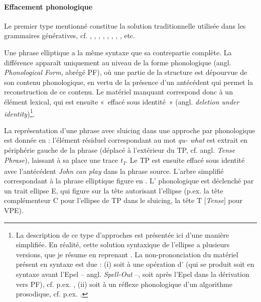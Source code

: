 \paragraph{Effacement phonologique}

Le premier type mentionné constitue la solution traditionnelle utilisée dans les grammaires génératives, cf. \citet{Ross1967,Ross1969}, \citet{Sag1976}, \citet{HankamerEtAl1976}, \citet{Hankamer1979}, \citet{Lasnik1999}, \citet{Hartmann2000}, \citet{Merchant2001}, \citet{Chung2005}, etc.

Une phrase elliptique a la même syntaxe que sa contrepartie complète. La différence apparaît uniquement au niveau de la forme phonologique (angl. \textit{Phonological Form}, abrégé PF), où une partie de la structure est dépourvue de son contenu phonologique, en vertu de la présence d’un antécédent qui permet la reconstruction de ce contenu. Le matériel manquant correspond donc à un élément lexical, qui est ensuite «~effacé sous identité~» (angl. \textit{deletion under identity})\footnote{La description de ce type d’approches est présentée ici d’une manière simplifiée. En réalité, cette solution syntaxique de l’ellipse a plusieurs versions, que je résume en reprenant \citet{Merchant2009}. La non-prononciation du matériel présent en syntaxe est due : (i) soit à une opération d’ (qui se produit soit en syntaxe avant l’Epel – angl. \textit{Spell-Out} –, soit après l’Epel dans la dérivation vers PF), cf. p.ex. \citet{Sag1976}, (ii) soit à un réflexe phonologique d’un algorithme prosodique, cf. p.ex. \citet{Merchant2001}.}. 

La représentation d’une phrase avec sluicing dans une approche par  phonologique est donnée en  : l’élément résiduel correspondant au mot \textit{qu- what} est extrait en périphérie gauche de la phrase (déplacé à l’extérieur du TP, cf. angl. \textit{Tense Phrase}), laissant à sa place une trace \textit{t}\textit{\textsubscript{1}}. Le TP est ensuite effacé sous identité avec l’antécédent \textit{John can play} dans la phrase source. L’arbre simplifié correspondant à la phrase elliptique figure en . L’ phonologique est déclenché par un trait ellipse E, qui figure sur la tête autorisant l’ellipse (p.ex. la tête complémenteur C pour l’ellipse de TP dans le sluicing, la tête T [\textit{Tense}] pour VPE).  

